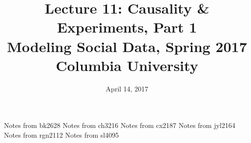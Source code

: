 \documentclass{article}
\title{
Lecture 11: Causality \& Experiments, Part 1 \\  %
Modeling Social Data, Spring 2017 \\   %
Columbia University                    %
}
\date{April 14, 2017}                %
\makeatletter
\let\org@subfile
\renewcommand*{}[1]{%
  \filename@parse{#1}%
  \expandafter
  \graphicspath\expandafter{\expandafter{\filename@area}}%
  \org@subfile{#1}%
}
\makeatother
\begin{document}
\maketitle


\pagebreak \newpage \noindent\Huge{Notes from bk2628} \normalsize \setcounter{section}{0} 
\pagebreak \newpage \noindent\Huge{Notes from ch3216} \normalsize \setcounter{section}{0} 
\pagebreak \newpage \noindent\Huge{Notes from cx2187} \normalsize \setcounter{section}{0} 
\pagebreak \newpage \noindent\Huge{Notes from jyl2164} \normalsize \setcounter{section}{0} 
\pagebreak \newpage \noindent\Huge{Notes from rgn2112} \normalsize \setcounter{section}{0} 
\pagebreak \newpage \noindent\Huge{Notes from sl4095} \normalsize \setcounter{section}{0} 
\end{document}

